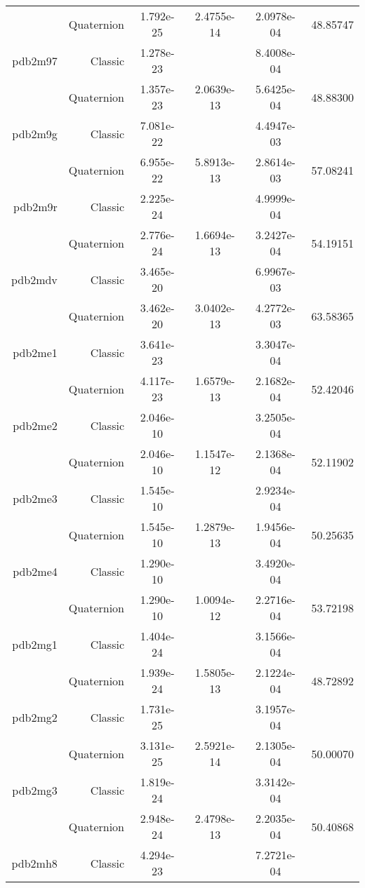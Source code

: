 \begin{xltabular}{\textwidth}{r|rS[table-format=1.3e+2]S[table-format=1.4e+2]S[table-format=1.4e+2]S[table-format=-1.5]}
& Quaternion & 1.792e-25 & 2.4755e-14 & 2.0978e-04 & 48.85747\\  \addlinespace
pdb2m97 & Classic & 1.278e-23 &  & 8.4008e-04 & \\
& Quaternion & 1.357e-23 & 2.0639e-13 & 5.6425e-04 & 48.88300\\  \addlinespace
pdb2m9g & Classic & 7.081e-22 &  & 4.4947e-03 & \\
& Quaternion & 6.955e-22 & 5.8913e-13 & 2.8614e-03 & 57.08241\\  \addlinespace
pdb2m9r & Classic & 2.225e-24 &  & 4.9999e-04 & \\
& Quaternion & 2.776e-24 & 1.6694e-13 & 3.2427e-04 & 54.19151\\  \addlinespace
pdb2mdv & Classic & 3.465e-20 &  & 6.9967e-03 & \\
& Quaternion & 3.462e-20 & 3.0402e-13 & 4.2772e-03 & 63.58365\\  \addlinespace
pdb2me1 & Classic & 3.641e-23 &  & 3.3047e-04 & \\
& Quaternion & 4.117e-23 & 1.6579e-13 & 2.1682e-04 & 52.42046\\  \addlinespace
pdb2me2 & Classic & 2.046e-10 &  & 3.2505e-04 & \\
& Quaternion & 2.046e-10 & 1.1547e-12 & 2.1368e-04 & 52.11902\\  \addlinespace
pdb2me3 & Classic & 1.545e-10 &  & 2.9234e-04 & \\
& Quaternion & 1.545e-10 & 1.2879e-13 & 1.9456e-04 & 50.25635\\  \addlinespace
pdb2me4 & Classic & 1.290e-10 &  & 3.4920e-04 & \\
& Quaternion & 1.290e-10 & 1.0094e-12 & 2.2716e-04 & 53.72198\\  \addlinespace
pdb2mg1 & Classic & 1.404e-24 &  & 3.1566e-04 & \\
& Quaternion & 1.939e-24 & 1.5805e-13 & 2.1224e-04 & 48.72892\\  \addlinespace
pdb2mg2 & Classic & 1.731e-25 &  & 3.1957e-04 & \\
& Quaternion & 3.131e-25 & 2.5921e-14 & 2.1305e-04 & 50.00070\\  \addlinespace
pdb2mg3 & Classic & 1.819e-24 &  & 3.3142e-04 & \\
& Quaternion & 2.948e-24 & 2.4798e-13 & 2.2035e-04 & 50.40868\\  \addlinespace
pdb2mh8 & Classic & 4.294e-23 &  & 7.2721e-04 & \\

\end{xltabular}
